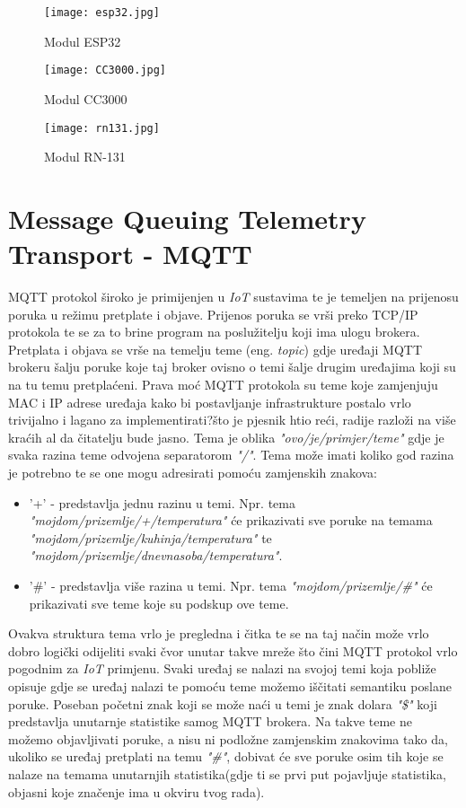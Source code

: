 \documentclass[times, utf8, zavrsni]{fer}
\begin{document}
{\begin{figure}[h]
    \centering
    \texttt{[image: esp32.jpg]}
    \caption{Modul ESP32}
\end{figure}

\begin{figure}[h]
    \centering
    \texttt{[image: CC3000.jpg]}
    \caption{Modul CC3000}
\end{figure}

\begin{figure}[H]
    \centering
    \texttt{[image: rn131.jpg]}
    \caption{Modul RN-131}
\end{figure}

\section{Message Queuing Telemetry Transport - \textbf{MQTT}}
MQTT protokol široko je primijenjen u \textit{IoT} sustavima te je temeljen na prijenosu poruka u režimu pretplate i objave.
Prijenos poruka se vrši preko TCP/IP protokola te se za to brine program na poslužitelju koji ima ulogu brokera.
Pretplata i objava se vrše na temelju teme (eng. \textit{topic}) gdje uređaji MQTT brokeru šalju poruke koje taj broker ovisno o temi šalje drugim uređajima koji su na tu temu pretplaćeni.
Prava moć MQTT protokola su teme koje zamjenjuju MAC i IP adrese uređaja kako bi postavljanje infrastrukture postalo vrlo trivijalno i lagano za implementirati?što je pjesnik htio reći, radije razloži na više kraćih al da čitatelju bude jasno.
Tema je oblika \textit{"ovo/je/primjer/teme"} gdje je svaka razina teme odvojena separatorom \textit{"/"}.
Tema može imati koliko god razina je potrebno te se one mogu adresirati pomoću zamjenskih znakova:
\begin{itemize}
    \item '+' - predstavlja jednu razinu u temi. Npr. tema \textit{"mojdom/prizemlje/+/temperatura"} će prikazivati sve poruke na temama \textit{"mojdom/prizemlje/kuhinja/temperatura"} te \textit{"mojdom/prizemlje/dnevnasoba/temperatura"}.
    \item '\#' - predstavlja više razina u temi. Npr. tema \textit{"mojdom/prizemlje/\#"} će prikazivati sve teme koje su podskup ove teme.
\end{itemize}
Ovakva struktura tema vrlo je pregledna i čitka te se na taj način može vrlo dobro logički odijeliti svaki čvor unutar takve mreže što čini MQTT protokol vrlo pogodnim za \textit{IoT} primjenu.
Svaki uređaj se nalazi na svojoj temi koja pobliže opisuje gdje se uređaj nalazi te pomoću teme možemo iščitati semantiku poslane poruke.
Poseban početni znak koji se može naći u temi je znak dolara \textit{"\$"} koji predstavlja unutarnje statistike samog MQTT brokera.
Na takve teme ne možemo objavljivati poruke, a nisu ni podložne zamjenskim znakovima tako da, ukoliko se uređaj pretplati na temu \textit{"\#"}, dobivat će sve poruke osim tih koje se nalaze na temama unutarnjih statistika(gdje ti se prvi put pojavljuje statistika, objasni koje značenje ima u okviru tvog rada).

}
\end{document}
